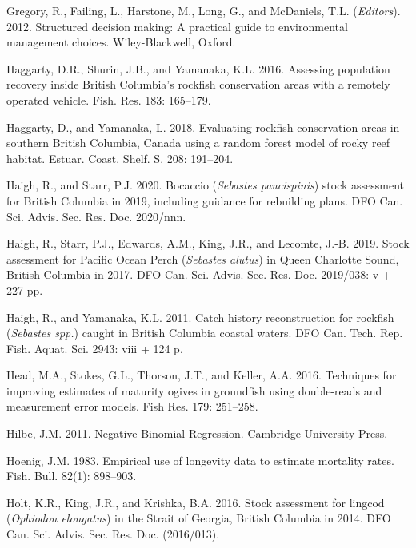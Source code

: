 \documentclass[11pt]{book}
\begin{document}
\leavevmode\hypertarget{ref-gregory2012}{}%
Gregory, R., Failing, L., Harstone, M., Long, G., and McDaniels, T.L. (\emph{Editors}). 2012. Structured decision making: A practical guide to environmental management choices. Wiley-Blackwell, Oxford.

\leavevmode\hypertarget{ref-haggarty2016b}{}%
Haggarty, D.R., Shurin, J.B., and Yamanaka, K.L. 2016. Assessing population recovery inside British Columbia's rockfish conservation areas with a remotely operated vehicle. Fish. Res. 183: 165--179.

\leavevmode\hypertarget{ref-haggarty2018}{}%
Haggarty, D., and Yamanaka, L. 2018. Evaluating rockfish conservation areas in southern British Columbia, Canada using a random forest model of rocky reef habitat. Estuar. Coast. Shelf. S. 208: 191--204.

\leavevmode\hypertarget{ref-haigh2020}{}%
Haigh, R., and Starr, P.J. 2020. Bocaccio (\emph{Sebastes paucispinis}) stock assessment for British Columbia in 2019, including guidance for rebuilding plans. DFO Can. Sci. Advis. Sec. Res. Doc. 2020/nnn.

\leavevmode\hypertarget{ref-haigh2019}{}%
Haigh, R., Starr, P.J., Edwards, A.M., King, J.R., and Lecomte, J.-B. 2019. Stock assessment for Pacific Ocean Perch (\emph{Sebastes alutus}) in Queen Charlotte Sound, British Columbia in 2017. DFO Can. Sci. Advis. Sec. Res. Doc. 2019/038: v + 227 pp.

\leavevmode\hypertarget{ref-haigh2011}{}%
Haigh, R., and Yamanaka, K.L. 2011. Catch history reconstruction for rockfish (\emph{Sebastes spp.}) caught in British Columbia coastal waters. DFO Can. Tech. Rep. Fish. Aquat. Sci. 2943: viii + 124 p.

\leavevmode\hypertarget{ref-head2016}{}%
Head, M.A., Stokes, G.L., Thorson, J.T., and Keller, A.A. 2016. Techniques for improving estimates of maturity ogives in groundfish using double-reads and measurement error models. Fish Res. 179: 251--258.

\leavevmode\hypertarget{ref-hilbe2011}{}%
Hilbe, J.M. 2011. Negative Binomial Regression. Cambridge University Press.

\leavevmode\hypertarget{ref-hoenig1983}{}%
Hoenig, J.M. 1983. Empirical use of longevity data to estimate mortality rates. Fish. Bull. 82(1): 898--903.

\leavevmode\hypertarget{ref-holt2016}{}%
Holt, K.R., King, J.R., and Krishka, B.A. 2016. Stock assessment for lingcod (\emph{Ophiodon elongatus}) in the Strait of Georgia, British Columbia in 2014. DFO Can. Sci. Advis. Sec. Res. Doc. (2016/013).
\end{document}
